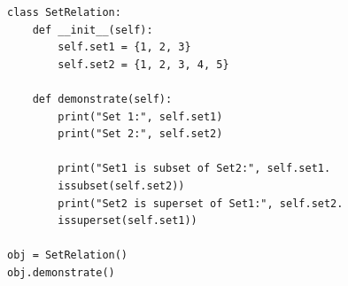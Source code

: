 \begin{verbatim}
class SetRelation:
    def __init__(self):
        self.set1 = {1, 2, 3}
        self.set2 = {1, 2, 3, 4, 5}

    def demonstrate(self):
        print("Set 1:", self.set1)
        print("Set 2:", self.set2)

        print("Set1 is subset of Set2:", self.set1.
        issubset(self.set2))
        print("Set2 is superset of Set1:", self.set2.
        issuperset(self.set1))

obj = SetRelation()
obj.demonstrate()
\end{verbatim}